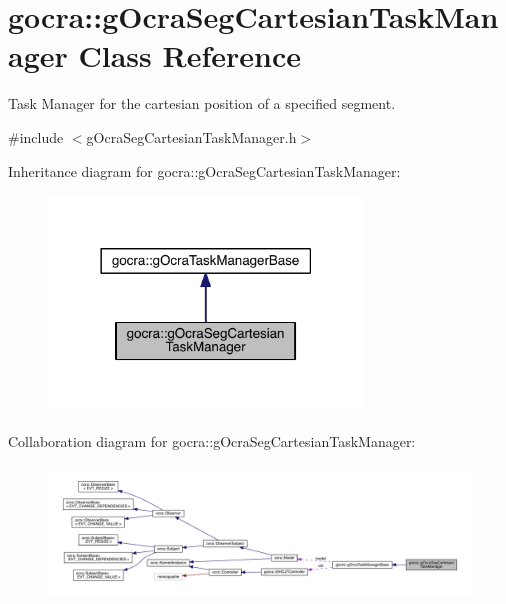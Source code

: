 \hypertarget{classgocra_1_1gOcraSegCartesianTaskManager}{}\section{gocra\+:\+:g\+Ocra\+Seg\+Cartesian\+Task\+Manager Class Reference}
\label{classgocra_1_1gOcraSegCartesianTaskManager}


Task Manager for the cartesian position of a specified segment.  




{\ttfamily \#include $<$g\+Ocra\+Seg\+Cartesian\+Task\+Manager.\+h$>$}



Inheritance diagram for gocra\+:\+:g\+Ocra\+Seg\+Cartesian\+Task\+Manager\+:\nopagebreak
\begin{figure}[H]
\begin{center}
\leavevmode
\includegraphics[width=237pt]{db/dfa/classgocra_1_1gOcraSegCartesianTaskManager__inherit__graph}
\end{center}
\end{figure}


Collaboration diagram for gocra\+:\+:g\+Ocra\+Seg\+Cartesian\+Task\+Manager\+:
\nopagebreak
\begin{figure}[H]
\begin{center}
\leavevmode
\includegraphics[width=350pt]{d6/d7e/classgocra_1_1gOcraSegCartesianTaskManager__coll__graph}
\end{center}
\end{figure}
